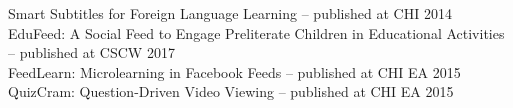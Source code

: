 \documentclass[margin,line]{resume}
\begin{document}
\begin{resume}
Smart Subtitles for Foreign Language Learning -- published at CHI 2014\\ %
EduFeed: A Social Feed to Engage Preliterate Children in Educational Activities -- published at CSCW 2017\\
FeedLearn: Microlearning in Facebook Feeds -- published at CHI EA 2015\\
QuizCram: Question-Driven Video Viewing -- published at CHI EA 2015\\ %
%

\end{resume}
\end{document}
